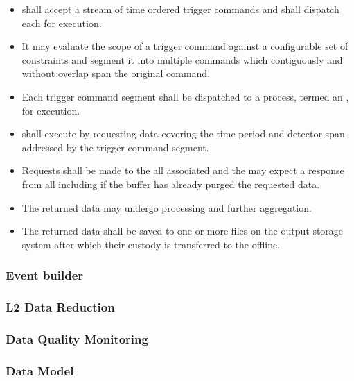\begin{itemize}
\item {} shall accept a stream of time ordered trigger commands and shall dispatch each for execution.
\item It may evaluate the scope of a trigger command against a configurable set of constraints and segment it into multiple commands which contiguously and without overlap span the original command.
\item Each trigger command segment shall be dispatched to a process, termed an , for execution.
\item {} shall execute by requesting data covering the time period and detector span addressed by the trigger command segment.
\item Requests shall be made to the all associated  and the  may expect a response from all including if the buffer has already purged the requested data.
\item The returned data may undergo processing and further aggregation.
\item The returned data shall be saved to one or more files on the output storage system after which their custody is transferred to the offline.
\end{itemize}



\subsubsection{Event builder}
\label{sec:fd-daq:design-event-builder}


\subsubsection{L2 Data Reduction}

\subsubsection{Data Quality Monitoring}

\subsubsection{Data Model}
\label{sec:fd-daq:design-data-model}

